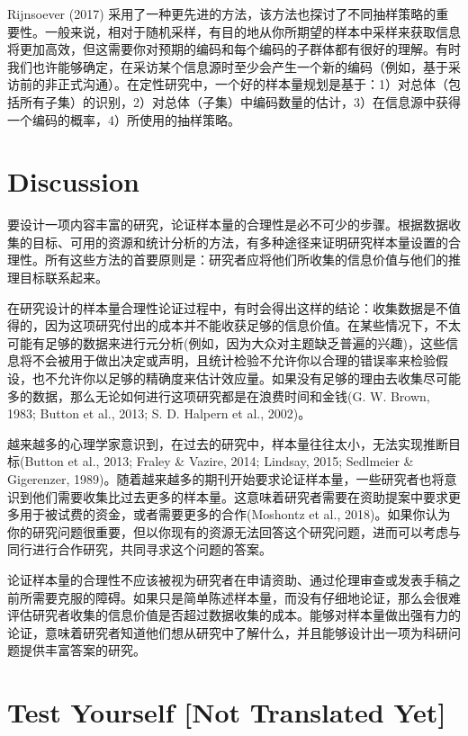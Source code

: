 \documentclass[
  letterpaper,
  DIV=11,
  numbers=noendperiod]{scrreprt}
\begin{document}
Rijnsoever (2017)
采用了一种更先进的方法，该方法也探讨了不同抽样策略的重要性。一般来说，相对于随机采样，有目的地从你所期望的样本中采样来获取信息将更加高效，但这需要你对预期的编码和每个编码的子群体都有很好的理解。有时我们也许能够确定，在采访某个信息源时至少会产生一个新的编码（例如，基于采访前的非正式沟通）。在定性研究中，一个好的样本量规划是基于：1）对总体（包括所有子集）的识别，2）对总体（子集）中编码数量的估计，3）在信息源中获得一个编码的概率，4）所使用的抽样策略。

\hypertarget{discussion}{%
\section{Discussion}\label{discussion}}

要设计一项内容丰富的研究，论证样本量的合理性是必不可少的步骤。根据数据收集的目标、可用的资源和统计分析的方法，有多种途径来证明研究样本量设置的合理性。所有这些方法的首要原则是：研究者应将他们所收集的信息价值与他们的推理目标联系起来。

在研究设计的样本量合理性论证过程中，有时会得出这样的结论：收集数据是不值得的，因为这项研究付出的成本并不能收获足够的信息价值。在某些情况下，不太可能有足够的数据来进行元分析(例如，因为大众对主题缺乏普遍的兴趣)，这些信息将不会被用于做出决定或声明，且统计检验不允许你以合理的错误率来检验假设，也不允许你以足够的精确度来估计效应量。如果没有足够的理由去收集尽可能多的数据，那么无论如何进行这项研究都是在浪费时间和金钱(G.
W. Brown, 1983; Button et al., 2013; S. D. Halpern et al., 2002)。

越来越多的心理学家意识到，在过去的研究中，样本量往往太小，无法实现推断目标(Button
et al., 2013; Fraley \& Vazire, 2014; Lindsay, 2015; Sedlmeier \&
Gigerenzer,
1989)。随着越来越多的期刊开始要求论证样本量，一些研究者也将意识到他们需要收集比过去更多的样本量。这意味着研究者需要在资助提案中要求更多用于被试费的资金，或者需要更多的合作(Moshontz
et al.,
2018)。如果你认为你的研究问题很重要，但以你现有的资源无法回答这个研究问题，进而可以考虑与同行进行合作研究，共同寻求这个问题的答案。

论证样本量的合理性不应该被视为研究者在申请资助、通过伦理审查或发表手稿之前所需要克服的障碍。如果只是简单陈述样本量，而没有仔细地论证，那么会很难评估研究者收集的信息价值是否超过数据收集的成本。能够对样本量做出强有力的论证，意味着研究者知道他们想从研究中了解什么，并且能够设计出一项为科研问题提供丰富答案的研究。

\hypertarget{test-yourself-not-translated-yet}{%
\section{Test Yourself {[}Not Translated
Yet{]}}\label{test-yourself-not-translated-yet}}
\end{document}
